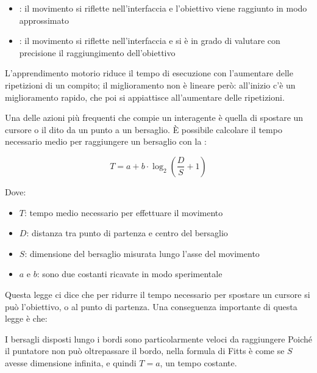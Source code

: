 \begin{itemize}
    \item {}: il movimento si riflette nell'interfaccia e l'obiettivo viene raggiunto in modo approssimato
    \item {}: il movimento si riflette nell'interfaccia e si è in grado di valutare con precisione il raggiungimento dell'obiettivo
\end{itemize}

L'apprendimento motorio riduce il tempo di esecuzione con l'aumentare delle ripetizioni di un compito; il miglioramento non è lineare però: all'inizio c'è un miglioramento rapido, che poi si appiattisce all'aumentare delle ripetizioni.

Una delle azioni più frequenti che compie un interagente è quella di spostare un cursore o il dito da un punto a un bersaglio. È possibile calcolare il tempo necessario medio per raggiungere un bersaglio con la :

$$ T = a+b\cdot\log_2{\left(\frac{D}{S}+1\right)} $$

Dove:

\begin{itemize}
    \item $T$: tempo medio necessario per effettuare il movimento
    \item $D$: distanza tra punto di partenza e centro del bersaglio
    \item $S$: dimensione del bersaglio misurata lungo l'asse del movimento
    \item $a$ e $b$: sono due costanti ricavate in modo sperimentale
\end{itemize}

Questa legge ci dice che per ridurre il tempo necessario per spostare un cursore si può  l'obiettivo, o  al punto di partenza. Una conseguenza importante di questa legge è che:

\begin{calloutinfo}{I bersagli disposti lungo i bordi sono particolarmente veloci da raggiungere}
    Poiché il puntatore non può oltrepassare il bordo, nella formula di Fitts è come se $S$ avesse dimensione infinita, e quindi $T=a$, un tempo costante.
\end{calloutinfo}
